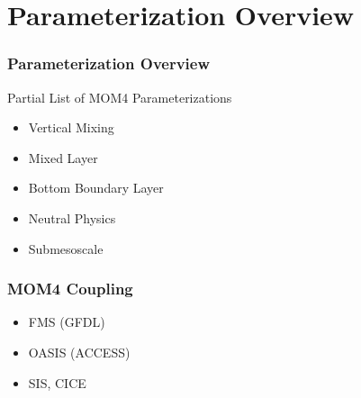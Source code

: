 \documentclass[red]{beamer}
\begin{document}
\section{Parameterization Overview}
\begin{frame}
    \frametitle{Parameterization Overview}
    
    Partial List of MOM4 Parameterizations
    \begin{itemize}
        \item Vertical Mixing
        \item Mixed Layer
        \item Bottom Boundary Layer
        \item Neutral Physics
        \item Submesoscale
    \end{itemize}
\end{frame}

\begin{frame}
    \frametitle{MOM4 Coupling}
    
    \begin{itemize}
        \item FMS (GFDL)
        \item OASIS (ACCESS)
        \item SIS, CICE
    \end{itemize}
\end{frame}

\end{document}

